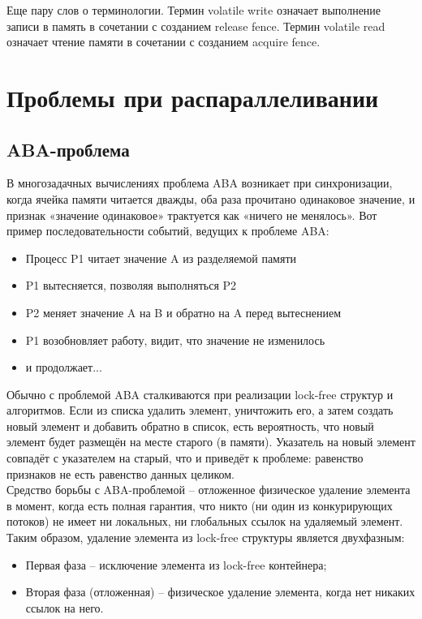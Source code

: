 \documentclass{article}
\begin{document}
Еще пару слов о терминологии. Термин volatile write означает выполнение записи в память в сочетании с созданием release fence. Термин volatile read означает чтение памяти в сочетании с созданием acquire fence.

\section{Проблемы при распараллеливании}
\subsection{ABA-проблема}
\label{aba-problem}
В многозадачных вычислениях проблема ABA возникает при синхронизации, когда ячейка памяти читается дважды, оба раза прочитано одинаковое значение, и признак «значение одинаковое» трактуется как «ничего не менялось».
Вот пример последовательности событий, ведущих к проблеме ABA:
\begin{itemize}
    \item Процесс P1 читает значение A из разделяемой памяти
    \item P1 вытесняется, позволяя выполняться P2
    \item P2 меняет значение A на B и обратно на A перед вытеснением
    \item P1 возобновляет работу, видит, что значение не изменилось
    \item и продолжает...
\end{itemize}

Обычно с проблемой ABA сталкиваются при реализации lock-free структур и алгоритмов. Если из списка удалить элемент, уничтожить его, а затем создать новый элемент и добавить обратно в список, есть вероятность, что новый элемент будет размещён на месте старого (в памяти). Указатель на новый элемент совпадёт с указателем на старый, что и приведёт к проблеме: равенство признаков не есть равенство данных целиком.\\

Средство борьбы с ABA-проблемой – отложенное физическое удаление элемента в момент, когда есть полная гарантия, что никто (ни один из конкурирующих потоков) не имеет ни локальных, ни глобальных ссылок на удаляемый элемент.
Таким образом, удаление элемента из lock-free структуры является двухфазным:
\begin{itemize}
    \item Первая фаза – исключение элемента из lock-free контейнера;
    \item Вторая фаза (отложенная) – физическое удаление элемента, когда нет никаких ссылок на него.
\end{itemize}
\end{document}
